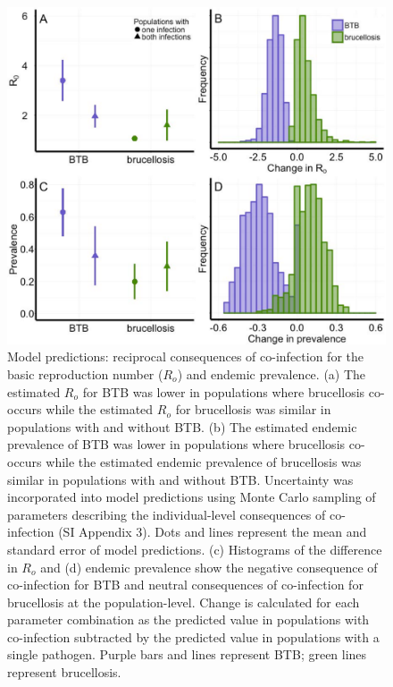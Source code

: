 \documentclass[10pt,letterpaper]{article}
\begin{document}
\begin{figure}[hb]%
\centering
\includegraphics[width=.8\linewidth]{Figure3_lowres.pdf}
\caption{Model predictions: reciprocal consequences of co-infection for the basic reproduction number ($R_o$) and endemic prevalence. (a) The estimated $R_o$ for BTB was lower in populations where brucellosis co-occurs while the estimated $R_o$ for brucellosis was similar in populations with and without BTB. (b) The estimated endemic prevalence of BTB was lower in populations where brucellosis co-occurs while the estimated endemic prevalence of brucellosis was similar in populations with and without BTB.  Uncertainty was incorporated into model predictions using Monte Carlo sampling of parameters describing the individual-level consequences of co-infection (SI Appendix 3). Dots and lines represent the mean and standard error of model predictions. (c) Histograms of the difference in $R_o$ and (d) endemic prevalence show the negative consequence of co-infection for BTB and neutral consequences of co-infection for brucellosis at the population-level. Change is calculated for each parameter combination as the predicted value in populations with co-infection subtracted by the predicted value in populations with a single pathogen. Purple bars and lines represent BTB; green lines represent brucellosis. }
\label{fig:fig3}
\end{figure}
\end{document}
